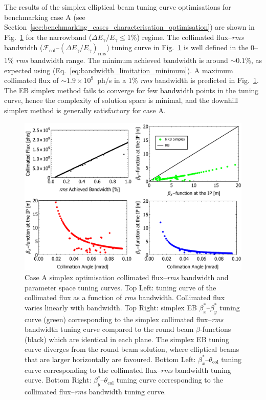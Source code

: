 \documentclass[../main.tex]{subfiles}
\begin{document}
The results of the simplex elliptical beam tuning curve optimisations for benchmarking case A (see Section~\ref{sec:benchmarking_cases_characterisation_optimisation}) are shown in Fig.~\ref{fig:case_A_simplex_tuning_curves} for the narrowband ($\Delta E_{\gamma}/E_{\gamma} \leq1$\%) regime. The collimated flux--\textit{rms} bandwidth ($\mathcal{F}_{\mathrm{col}}$--$\left(\Delta E_{\gamma}/E_{\gamma}\right)_{\mathrm{rms}}$) tuning curve in Fig.~\ref{fig:case_A_simplex_tuning_curves} is well defined in the 0--1\% \textit{rms} bandwidth range. The minimum achieved bandwidth is around $\sim0.1$\%, as expected using (Eq.~\ref{eq:bandwidth_limitation_minimum}). A maximum collimated flux of $\sim 1.9\times 10^{9}$~ph/\si{\second} in a 1\% \textit{rms} bandwidth is predicted in Fig.~\ref{fig:case_A_simplex_tuning_curves}. The EB simplex method fails to converge for few bandwidth points in the tuning curve, hence the complexity of solution space is minimal, and the downhill simplex method is generally satisfactory for case A. 
\begin{figure}[!h]
\centering
\includegraphics[width=\textwidth]{Figures/Optimisation_and_Characterisation_of_Inverse_Compton_Scattering_Sources/Case_A_simplex_Tuning_Curves.pdf}
\caption{Case A simplex optimisation collimated flux--\textit{rms} bandwidth and parameter space tuning curves. Top Left: tuning curve of the collimated flux as a function of \textit{rms} bandwidth. Collimated flux varies linearly with bandwidth. Top Right: simplex EB $\beta_{x}^{*}$--$\beta_{y}^{*}$ tuning curve (green) corresponding to the simplex collimated flux--\textit{rms} bandwidth tuning curve compared to the round beam $\beta$-functions (black) which are identical in each plane. The simplex EB tuning curve diverges from the round beam solution, where elliptical beams that are larger horizontally are favoured. Bottom Left: $\beta_{x}^{*}$--$\theta_{\mathrm{col}}$ tuning curve corresponding to the collimated flux--\textit{rms} bandwidth tuning curve. Bottom Right: $\beta_{y}^{*}$--$\theta_{\mathrm{col}}$ tuning curve corresponding to the collimated flux--\textit{rms} bandwidth tuning curve.}
\label{fig:case_A_simplex_tuning_curves}
\end{figure}
\end{document}
